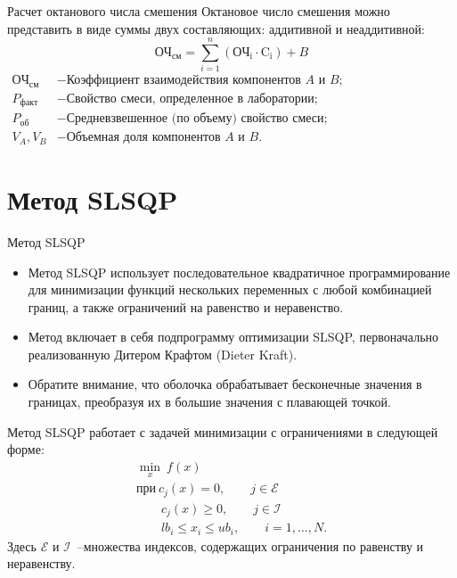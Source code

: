 \documentclass[aspectratio=169, mathserif]{beamer}%
\begin{document}
\begin{frame}[fragile, label=c]{Расчет октанового числа смешения}
\scriptsize
Октановое число смешения можно представить в виде суммы двух составляющих: аддитивной и неаддитивной:
\vfill
\begin{equation}
	\mathrm{ОЧ}_{\mathrm{см}} = \sum \limits _{i=1} ^{n} \left(\mathrm{ОЧ_{i} \cdot C_{i}}\right) + B
\end{equation}
\vfill
$
\begin{aligned}
\mathrm{ОЧ}_{\mathrm{см}} &- \text{Коэффициент взаимодействия компонентов $A$ и $B$}; \\
P_{\mathrm{факт}} &- \text{Свойство смеси, определенное в лаборатории}; \\
P_{\mathrm{об}} &- \text{Средневзвешенное (по объему) свойство смеси}; \\
V_A, V_B &- \text{Объемная доля компонентов $A$ и $B$}.
\end{aligned}
$
\vfill
\end{frame}


\section{Метод SLSQP}
\begin{frame}[fragile, label=c]{Метод SLSQP}
\scriptsize
\begin{itemize}
\item Метод SLSQP использует последовательное квадратичное программирование для минимизации функций нескольких переменных с любой комбинацией границ, а также ограничений на равенство и неравенство.
\item Метод включает в себя подпрограмму оптимизации SLSQP, первоначально реализованную Дитером Крафтом (Dieter Kraft).
\item Обратите внимание, что оболочка обрабатывает бесконечные значения в границах, преобразуя их в большие значения с плавающей точкой.
\end{itemize}
\vfill
Метод SLSQP работает с задачей минимизации с ограничениями в следующей форме:
\vfill
\begin{equation}\label{eq:problem}
\begin{gathered}
\underset{x}{\min}\ f\left(x\right) \\
\mathrm{при }\ c_j\left(x\right) = 0, \qquad j \in \mathcal{E} \\
\qquad c_j\left(x\right) \geqslant 0, \qquad j \in \mathcal{I} \\
\qquad lb_i \leqslant x_i \leqslant ub_i, \qquad i = 1, \ldots , N.
\end{gathered}
\end{equation}
\vfill
Здесь $\mathcal{E}$ и $\mathcal{I}$~--множества индексов, содержащих ограничения по равенству и неравенству.
\vfill
\end{frame}
\end{document}

